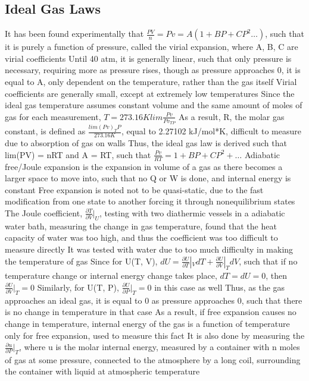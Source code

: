 \documentclass[11 pt, twoside]{article}
\newenvironment{outline*}
{
	\begin{outline}[enumerate]
	}
	{\end{outline}
}
\begin{document}
\subsection{Ideal Gas Laws}
\begin{outline*}
\1 It has been found experimentally that $\frac{PV}{n} = Pv = A(1 + BP + CP^2 \dots)$, such that it is purely a function of pressure, called the virial expansion, where A, B, C are virial coefficients
\2 Until 40 atm, it is generally linear, such that only pressure is necessary, requiring more as pressure rises, though as pressure approaches 0, it is equal to A, only dependent on the temperature, rather than the gas itself 
\3 Virial coefficients are generally small, except at extremely low temperatures
\2 Since the ideal gas temperature assumes constant volume and the same amount of moles of gas for each measurement, $T = 273.16 K lim \frac{Pv}{Pv_{TP}}$
\3 As a result, R, the molar gas constant, is defined as $\frac{lim(Pv)_TP}{273.16 K}$, equal to 2.27102 kJ/mol*K, difficult to measure due to absorption of gas on walls
\3 Thus, the ideal gas law is derived such that lim(PV) = nRT and A = RT, such that $\frac{Pv}{RT} = 1 + BP + CP^2 + \dots$
\1 Adiabatic free/Joule expansion is the expansion in volume of a gas as there becomes a larger space to move into, such that no Q or W is done, and internal energy is constant
\2 Free expansion is noted not to be quasi-static, due to the fast modification from one state to another forcing it through nonequilibrium states
\2 The Joule coefficient, $\frac{\partial T}{\partial V}|_U$, testing with two diathermic vessels in a adiabatic water bath, measuring the change in gas temperature, found that the heat capacity of water was too high, and thus the coefficient was too difficult to measure directly
\3 It was tested with water due to too much difficulty in making the temperature of gas
\2 Since for U(T, V), $dU = \frac{\partial U}{\partial T}|_VdT + \frac{\partial U}{\partial V}|_TdV$, such that if no temperature change or internal energy change takes place, $dT = dU = 0$, then $\frac{\partial U}{\partial V}|_T = 0$
\3 Similarly, for U(T, P), $\frac{\partial U}{\partial P}|_T = 0$ in this case as well
\4 Thus, as the gas approaches an ideal gas, it is equal to 0 as pressure approaches 0, such that there is no change in temperature in that case
\3 As a result, if free expansion causes no change in temperature, internal energy of the gas is a function of temperature only for free expansion, used to measure this fact
\3 It is also done by measuring the $\frac{\partial u}{\partial P}|_T$, where u is the molar internal energy, measured by a container with n moles of gas at some pressure, connected to the atmosphere by a long coil, surrounding the container with liquid at atmospheric temperature

\end{outline*}
\end{document}
